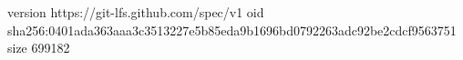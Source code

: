version https://git-lfs.github.com/spec/v1
oid sha256:0401ada363aaa3c3513227e5b85eda9b1696bd0792263adc92be2cdcf9563751
size 699182
